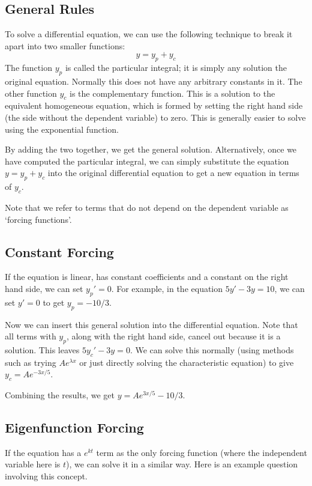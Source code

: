 \subsection{General Rules}
To solve a differential equation, we can use the following technique to break it apart into two smaller functions:
\[
	y = y_p + y_c
\]
The function \(y_p\) is called the particular integral; it is simply any solution
the original equation.
Normally this does not have any arbitrary constants in it.
The other function \(y_c\) is the complementary function.
This is a solution to the equivalent homogeneous equation, which is formed by setting the right hand side (the side without the dependent variable) to zero.
This is generally easier to solve using the exponential function.

By adding the two together, we get the general solution.
Alternatively, once we have computed the particular integral, we can simply substitute the equation \(y = y_p + y_c\) into the original differential equation to get a new equation in terms of \(y_c\).

Note that we refer to terms that do not depend on the dependent variable as `forcing functions'.

\subsection{Constant Forcing}
If the equation is linear, has constant coefficients and a constant on the right hand side, we can set \(y_p' = 0\).
For example, in the equation \(5y' - 3y = 10\), we can set \(y' = 0\) to get \(y_p = -10/3\).

Now we can insert this general solution into the differential equation.
Note that all terms with \(y_p\), along with the right hand side, cancel out because it is a solution.
This leaves \(5y_c' - 3y = 0\).
We can solve this normally (using methods such as trying \(Ae^{\lambda x}\) or just directly solving the characteristic equation) to give \(y_c = Ae^{-3x/5}\).

Combining the results, we get \(y = Ae^{3x/5} - 10/3\).

\subsection{Eigenfunction Forcing}
If the equation has a \(e^{kt}\) term as the only forcing function (where the independent variable here is \(t\)), we can solve it in a similar way.
Here is an example question involving this concept.

